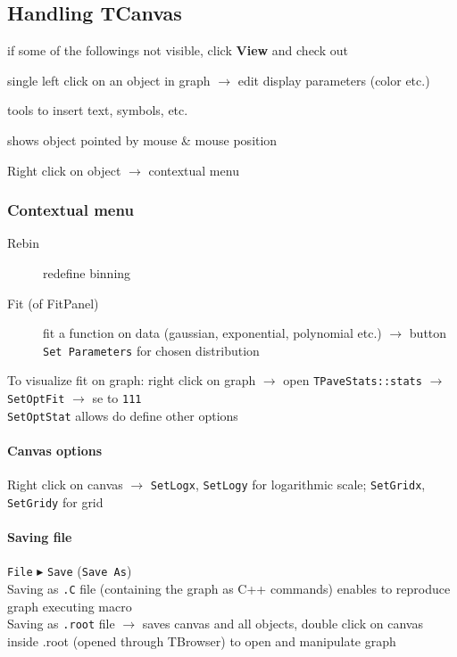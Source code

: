 \documentclass[10pt, twoside]{article}
\newcommand{\ttt}[1]{\colorbox{boxgray}{\texttt{#1}}}
\begin{document}
\subsection*{Handling TCanvas}
if some of the followings not visible, click \textbf{View} and check out
\begin{description}
\item[Editor] single left click on an object in graph $\rightarrow$ edit display parameters (color etc.)
\item[Toolbar] tools to insert text, symbols, etc.
\item[Status bar] shows object pointed by mouse \& mouse position
\item Right click on object $\rightarrow$ contextual menu
\end{description}
\subsubsection*{Contextual menu}
\begin{description}
\item[Rebin] redefine binning
\item[Fit (of FitPanel)] fit a function on data (gaussian, exponential, polynomial etc.) $\rightarrow$ button \ttt{Set Parameters} for chosen distribution
\end{description}
To visualize fit on graph: right click on graph $\rightarrow$ open \ttt{TPaveStats::stats} $\rightarrow$ \ttt{SetOptFit} $\rightarrow$ se to \ttt{111}
\\\ttt{SetOptStat} allows do define other options
\paragraph{Canvas options} Right click on canvas $\rightarrow$ \ttt{SetLogx}, \ttt{SetLogy} for logarithmic scale; \ttt{SetGridx}, \ttt{SetGridy} for grid
\paragraph{Saving file} \ttt{File} $\blacktriangleright$ \ttt{Save} (\ttt{Save As})
\\Saving as \ttt{.C} file (containing the graph as C++ commands) enables to reproduce graph executing macro
\\Saving as \ttt{.root} file $\rightarrow$ saves canvas and all objects, double click on canvas inside .root (opened through TBrowser) to open and manipulate graph
\end{document}
